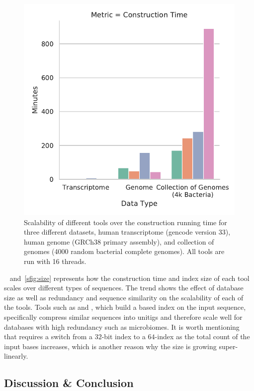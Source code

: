 \begin{figure}[h!]
    \includegraphics[width=0.8\columnwidth,type=pdf,ext=.pdf,read=.pdf]
    {Figures/puff/indexTimeScale}
    \caption[scalability of different aligners - time]
    {Scalability of different tools over the construction running time for three
    different datasets, human transcriptome (gencode version 33), human
    genome (GRCh38 primary assembly), and collection of genomes (4000
    random bacterial complete genomes). All tools are run with 16 threads.}
    \label{sfig:construction}
    \vspace{-0.2in}
\end{figure}

~ and~\cref{sfig:size} represents how the construction time and
index size of each tool scales over different types of sequences. 
The trend shows the effect of database size as well as redundancy and sequence similarity on
the scalability of each of the tools. Tools such as \puffaligner and
\debga, which build a \dbg based index on the input sequence,
specifically compress similar sequences into unitigs and therefore
scale well for databases with high redundancy such as microbiomes. It is 
worth mentioning that \bt requires a switch from a $32$-bit
index to a $64$-index as the total count of the input bases
increases, which is another reason why the size is growing super-linearly.

\subsection{Discussion \& Conclusion}
\label{sec:conclusion}

